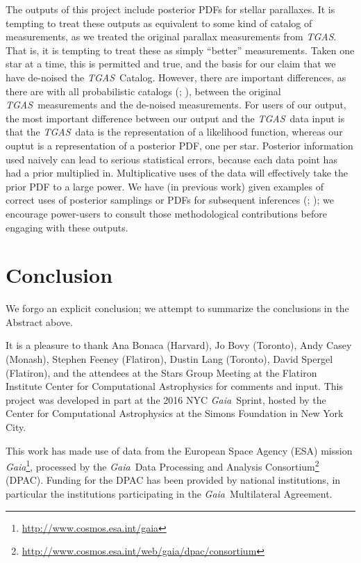 \documentclass[modern]{aastex61}
\newcommand{\acronym}[1]{{\small{#1}}}
\newcommand{\project}[1]{\textsl{#1}}
\newcommand{\tgas}{\project{\acronym{TGAS}}}
\newcommand{\gaia}{\project{Gaia}}
\begin{document}
The outputs of this project include posterior PDFs for stellar parallaxes.
It is tempting to treat these outputs as equivalent to some kind of catalog of
measurements, as we treated the original parallax measurements from \tgas.
That is, it is tempting to treat these as simply ``better'' measurements.
Taken one star at a time, this is permitted and true, and the basis for our
claim that we have de-noised the \tgas\ Catalog.
However, there are important differences, as there are with all
probabilistic catalogs (\citealt{hogg11}; \citealt{portillo17}), between the
original \tgas\ measurements and the de-noised measurements.
For users of our output, the most important difference between our
output and the \tgas\ data input is that the \tgas\ data is the representation
of a likelihood function, whereas our ouptut is a
representation of a posterior PDF, one per star.
Posterior information used naively can lead to serious statistical
errors, because each data point has had a prior multiplied in.
Multiplicative uses of the data will effectively take the prior
PDF to a large power.
We have (in previous work)
given examples of correct uses of posterior samplings or PDFs
for subsequent inferences (\citealt{hogg08}; \citealt{dfm14}); we
encourage power-users to consult those methodological
contributions before engaging with these outputs.

\section{Conclusion}
We forgo an explicit conclusion; we attempt to summarize the conclusions in the Abstract above.

\acknowledgments It is a pleasure to thank
  Ana Bonaca (Harvard),
  Jo Bovy (Toronto),
  Andy Casey (Monash),
  Stephen Feeney (Flatiron),
  Dustin Lang (Toronto),
  David Spergel (Flatiron),
and the attendees at the Stars Group Meeting at the Flatiron Institute
Center for Computational Astrophysics for comments and input.
This project was developed in part at the 2016 \acronym{NYC} \gaia\ Sprint, hosted
by the Center for Computational Astrophysics at the Simons Foundation
in New York City.

This work has made use of data from the European Space Agency (\acronym{ESA})
mission \gaia\footnote{\url{http://www.cosmos.esa.int/gaia}}, processed by the \gaia\ Data
Processing and Analysis Consortium\footnote{\url{http://www.cosmos.esa.int/web/gaia/dpac/consortium}} (\acronym{DPAC}). Funding for the
\acronym{DPAC} has been provided by national institutions, in particular the
institutions participating in the \gaia\ Multilateral Agreement.
\end{document}

